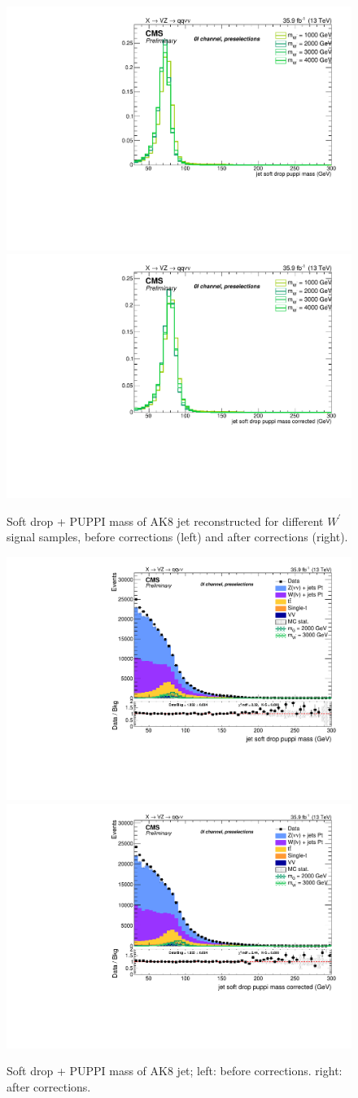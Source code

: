 \begin{figure}[!htb]
  \begin{center}
    \includegraphics[width=.495\textwidth]{plots/v9/XVZnnPre/FatJet1_softdropPuppiMass_signalWZ.pdf}
    \includegraphics[width=.495\textwidth]{plots/v9/XVZnnPre/FatJet1_softdropPuppiMassCorr_signalWZ.pdf}
  \end{center}
  \caption{Soft drop + PUPPI mass of AK8 jet reconstructed for different $W^{'}$ signal samples, before corrections (left) and after corrections (right).}
  \label{fig:fatjet_pre_softdroppuppimass_WZ}
\end{figure}

\begin{figure}[!htb]
  \begin{center}
    \includegraphics[width=.495\textwidth]{plots/v9/XVZnnPre/FatJet1_softdropPuppiMass.pdf}
    \includegraphics[width=.495\textwidth]{plots/v9/XVZnnPre/FatJet1_softdropPuppiMassCorr.pdf}
  \end{center}
  \caption{Soft drop + PUPPI mass of AK8 jet; left: before corrections. right: after corrections.}
  \label{fig:fatjet_softdroppuppimass}
\end{figure}

